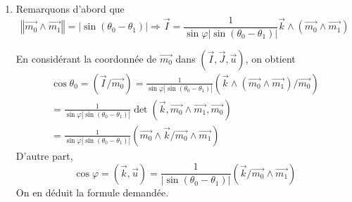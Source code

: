 \begin{enumerate}
 \item Remarquons d'abord que
\begin{displaymath}
 \left\Vert \overrightarrow{m_0}\wedge \overrightarrow{m_1}\right\Vert = |\sin(\theta_0 - \theta_1)|
\Rightarrow
 \overrightarrow{I} = \frac{1}{\sin \varphi |\sin(\theta_0 - \theta_1)|}
\overrightarrow{k}\wedge(\overrightarrow{m_0}\wedge \overrightarrow{m_1})
\end{displaymath}

En considérant la coordonnée de $\overrightarrow{m_0}$ dans $(\overrightarrow{I},\overrightarrow{J},\overrightarrow{u})$, on obtient
\begin{multline*}
 \cos \theta_0 = (\overrightarrow{I}/\overrightarrow{m_0})
=\frac{1}{\sin \varphi |\sin(\theta_0 - \theta_1)|}
(\overrightarrow{k}\wedge(\overrightarrow{m_0}\wedge \overrightarrow{m_1}) /\overrightarrow{m_0})\\
=\frac{1}{\sin \varphi |\sin(\theta_0 - \theta_1)|}
\det\left( \overrightarrow{k} , \overrightarrow{m_0}\wedge \overrightarrow{m_1} , \overrightarrow{m_0}\right)\\
=\frac{1}{\sin \varphi |\sin(\theta_0 - \theta_1)|}
\left( \overrightarrow{m_0}\wedge\overrightarrow{k} / \overrightarrow{m_0}\wedge \overrightarrow{m_1} \right)
\end{multline*}
D'autre part,
\begin{displaymath}
 \cos\varphi = (\overrightarrow{k},\overrightarrow{u})
= \frac{1}{|\sin(\theta_0 - \theta_1)|}(\overrightarrow{k}/\overrightarrow{m_0}\wedge \overrightarrow{m_1})
\end{displaymath}
On en déduit la formule demandée.
\end{enumerate}
